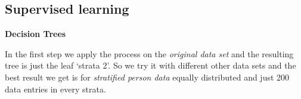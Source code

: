 \setlength{\parindent}{0em}

\subsection{Supervised learning}

\textbf{Decision Trees} \label{subsec: decisiontree}
%
%
%

In the first step we apply the process on the \textit{original data set} and the resulting tree is just the leaf `strata 2'. So we try it with different other data sets and the best result we get is for \textit{stratified person data} equally distributed and just 200 data entries in every strata.

